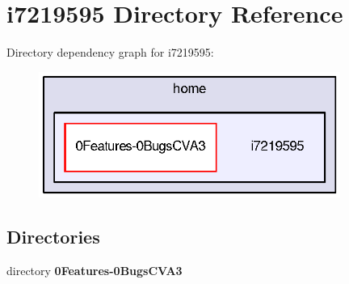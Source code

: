 \section{i7219595 Directory Reference}
\label{dir_33e1092793386abef3c364978452e2e1}
Directory dependency graph for i7219595\-:\nopagebreak
\begin{figure}[H]
\begin{center}
\leavevmode
\includegraphics[width=280pt]{dir_33e1092793386abef3c364978452e2e1_dep}
\end{center}
\end{figure}
\subsection*{Directories}
\begin{DoxyCompactItemize}
\item 
directory {\bf 0\-Features-\/0\-Bugs\-C\-V\-A3}
\end{DoxyCompactItemize}
